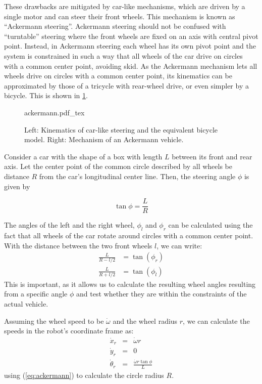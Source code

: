 These drawbacks are mitigated by car-like mechanisms, which are driven by a single motor and can steer their front wheels. This mechanism is known as ``Ackermann steering''. 
Ackermann steering should not be confused with ``turntable'' steering  where the front wheels are fixed on an axis with central pivot point.
Instead, in Ackermann steering each wheel has its own pivot point and the system is constrained in such a way that all wheels of the car drive on circles with a common center point, avoiding skid.
As the Ackermann mechanism lets all wheels drive on circles with a common center point, its kinematics can be approximated by those of a tricycle with rear-wheel drive, or even simpler by a bicycle. This is shown in \cref{fig:ackermann}.

\begin{figure}[htb!]
    \centering
    \def\svgwidth{0.9\textwidth}
    {ackermann.pdf_tex}
    \caption{Left: Kinematics of car-like steering and the equivalent bicycle model. Right: Mechanism of an Ackermann vehicle.}
    \label{fig:ackermann}
\end{figure}

Consider a car with the shape of a box with length $L$ between its front and rear axis. Let the center point of the common circle described by all wheels be distance $ R$ from the car's longitudinal center line. Then, the steering angle $ \phi$ is given by

\begin{equation}\label{eq:ackermann}
\tan \phi = \frac{L}{R}
\end{equation}

The angles of the left and the right wheel, $ \phi_l$ and $ \phi_r$ can be calculated using the fact that all wheels of the car rotate around circles with a common center point. With the distance between the two front wheels $l$, we can write:
\begin{eqnarray}
\frac{L}{R-l/2}&=\tan{(\phi_r)} \nonumber \\
\frac{L}{R+l/2}&=\tan{(\phi_l)}
\end{eqnarray}
This is important, as it allows us to calculate the resulting wheel angles resulting from a specific angle $\phi$ and test whether they are within the constraints of the actual vehicle.

Assuming the wheel speed to be $\dot{\omega}$ and the wheel radius $r$, we can calculate the speeds in the robot's coordinate frame as:
\begin{eqnarray}
\dot{x}_r&=&\dot{\omega}r \nonumber \\
\dot{y}_r&=&0\\
\dot{\theta}_r&=&\frac{\dot{\omega}r\tan\phi}{L} \nonumber
\end{eqnarray}
using (\ref{eq:ackermann}) to calculate the circle radius $R$.

